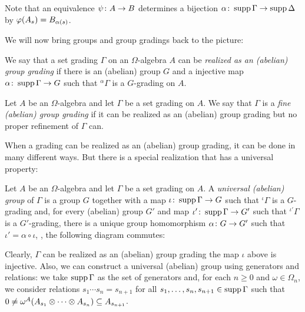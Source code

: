 Note that an equivalence $\psi\colon A \to B$ determines a bijection $\alpha \colon \operatorname{supp} \Gamma \to \operatorname{supp} \Delta$ by $\varphi(A_s) = B_{\alpha(s)}$. 

We will now bring groups and group gradings back to the picture:

\begin{defi}
    We say that a set grading $\Gamma$ on an $\Omega$-algebra $A$ can be \emph{realized as an (abelian) group grading} if there is an (abelian) group $G$ and a injective map $\alpha\colon \operatorname{supp} \Gamma \to G$ such that ${}^{\alpha}\Gamma$ is a $G$-grading on $A$. 
\end{defi}

\begin{defi}\label{defi:fine-grading}
    Let $A$ be an $\Omega$-algebra and let $\Gamma$ be a set grading on $A$. 
    We say that $\Gamma$ is a \emph{fine (abelian) group grading} if it can be realized as an (abelian) group grading but no proper refinement of $\Gamma$ can. 
\end{defi}

When a grading can be realized as an (abelian) group grading, it can be done in many different ways. 
But there is a special realization that has a universal property:

\begin{defi}\label{defi:universal-group}
    Let $A$ be an $\Omega$-algebra and let $\Gamma$ be a set grading on $A$. 
    A \emph{universal (abelian) group} of $\Gamma$ is a group $G$ together with a map $\iota\colon \operatorname{supp}\Gamma \to G$ such that ${}^{\iota}\Gamma$ is a $G$-grading and, for every (abelian) group $G'$ and map $\iota'\colon \operatorname{supp} \Gamma \to G'$ such that ${}^{\iota'}\Gamma$ is a $G'$-grading, there is a unique group homomorphism $\alpha\colon G \to G'$ such that $\iota' = \alpha \circ \iota$, \ie, the following diagram commutes:
	\begin{center}
	\end{center}
\end{defi}

Clearly, $\Gamma$ can be realized as an (abelian) group grading \IFF the map $\iota$ above is injective. 
Also, we can construct a universal (abelian) group using generators and relations: we take $\operatorname{supp} \Gamma$ as the set of generators and, for each $n\geq 0$ and $\omega \in \Omega_n$, we consider relations $s_1 \cdots s_n = s_{n+1}$ for all $s_1, \ldots, s_n, s_{n+1} \in \operatorname{supp} \Gamma$ such that $0 \neq \omega^A (A_{s_1} \otimes \cdots \otimes A_{s_n}) \subseteq A_{s_{n+1}}$. 

